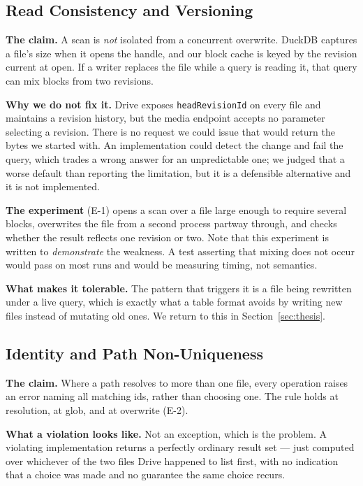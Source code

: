 \documentclass[sigconf, nonacm]{acmart}
\newcommand{\expref}[1]{\textsf{E-#1}}
\begin{document}
\subsection{Read Consistency and Versioning}

\textbf{The claim.} A scan is \emph{not} isolated from a concurrent overwrite.
DuckDB captures a file's size when it opens the handle, and our block cache is
keyed by the revision current at open. If a writer replaces the file while a
query is reading it, that query can mix blocks from two revisions.

\textbf{Why we do not fix it.} Drive exposes \texttt{headRevisionId} on every
file and maintains a revision history, but the media endpoint accepts no
parameter selecting a revision. There is no request we could issue that would
return the bytes we started with. An implementation could detect the change
and fail the query, which trades a wrong answer for an unpredictable one; we
judged that a worse default than reporting the limitation, but it is a
defensible alternative and it is not implemented.

\textbf{The experiment} (\expref{1}) opens a scan over a file large enough to
require several blocks, overwrites the file from a second process partway
through, and checks whether the result reflects one revision or two. Note that
this experiment is written to \emph{demonstrate} the weakness. A test asserting
that mixing does not occur would pass on most runs and would be measuring
timing, not semantics.

\textbf{What makes it tolerable.} The pattern that triggers it is a file being
rewritten under a live query, which is exactly what a table format avoids by
writing new files instead of mutating old ones. We return to this in
Section~\ref{sec:thesis}.

\subsection{Identity and Path Non-Uniqueness}

\textbf{The claim.} Where a path resolves to more than one file, every
operation raises an error naming all matching ids, rather than choosing one.
The rule holds at resolution, at glob, and at overwrite (\expref{2}).

\textbf{What a violation looks like.} Not an exception, which is the problem.
A violating implementation returns a perfectly ordinary result set --- just
computed over whichever of the two files Drive happened to list first, with no
indication that a choice was made and no guarantee the same choice recurs.
\end{document}
